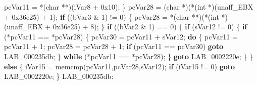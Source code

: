 \documentclass[
]{article}
\newenvironment{Shaded}{}{}
\newcommand{\BaseNTok}[1]{\textcolor[rgb]{0.25,0.63,0.44}{#1}}
\newcommand{\ControlFlowTok}[1]{\textcolor[rgb]{0.00,0.44,0.13}{\textbf{#1}}}
\newcommand{\DataTypeTok}[1]{\textcolor[rgb]{0.56,0.13,0.00}{#1}}
\newcommand{\DecValTok}[1]{\textcolor[rgb]{0.25,0.63,0.44}{#1}}
\newcommand{\NormalTok}[1]{#1}
\newcommand{\OperatorTok}[1]{\textcolor[rgb]{0.40,0.40,0.40}{#1}}
\begin{document}
\begin{Shaded}
\begin{Highlighting}[]
\NormalTok{      pcVar11 }\OperatorTok{=} \OperatorTok{*(}\DataTypeTok{char} \OperatorTok{**)(}\NormalTok{iVar8 }\OperatorTok{+} \BaseNTok{0x10}\OperatorTok{);}
    \OperatorTok{\}}
\NormalTok{    pcVar28 }\OperatorTok{=} \OperatorTok{(}\DataTypeTok{char} \OperatorTok{*)(*(}\DataTypeTok{int} \OperatorTok{*)(}\NormalTok{unaff\_EBX }\OperatorTok{+} \BaseNTok{0x36e25}\OperatorTok{)} \OperatorTok{+} \DecValTok{1}\OperatorTok{);}
    \ControlFlowTok{if} \OperatorTok{((}\NormalTok{bVar3 }\OperatorTok{\&} \DecValTok{1}\OperatorTok{)} \OperatorTok{!=} \DecValTok{0}\OperatorTok{)} \OperatorTok{\{}
\NormalTok{      pcVar28 }\OperatorTok{=} \OperatorTok{*(}\DataTypeTok{char} \OperatorTok{**)(*(}\DataTypeTok{int} \OperatorTok{*)(}\NormalTok{unaff\_EBX }\OperatorTok{+} \BaseNTok{0x36e25}\OperatorTok{)} \OperatorTok{+} \DecValTok{8}\OperatorTok{);}
    \OperatorTok{\}}
    \ControlFlowTok{if} \OperatorTok{((}\NormalTok{bVar2 }\OperatorTok{\&} \DecValTok{1}\OperatorTok{)} \OperatorTok{==} \DecValTok{0}\OperatorTok{)} \OperatorTok{\{}
      \ControlFlowTok{if} \OperatorTok{(}\NormalTok{sVar12 }\OperatorTok{!=} \DecValTok{0}\OperatorTok{)} \OperatorTok{\{}
        \ControlFlowTok{if} \OperatorTok{(*}\NormalTok{pcVar11 }\OperatorTok{==} \OperatorTok{*}\NormalTok{pcVar28}\OperatorTok{)} \OperatorTok{\{}
\NormalTok{          pcVar30 }\OperatorTok{=}\NormalTok{ pcVar11 }\OperatorTok{+}\NormalTok{ sVar12}\OperatorTok{;}
          \ControlFlowTok{do} \OperatorTok{\{}
\NormalTok{            pcVar11 }\OperatorTok{=}\NormalTok{ pcVar11 }\OperatorTok{+} \DecValTok{1}\OperatorTok{;}
\NormalTok{            pcVar28 }\OperatorTok{=}\NormalTok{ pcVar28 }\OperatorTok{+} \DecValTok{1}\OperatorTok{;}
            \ControlFlowTok{if} \OperatorTok{(}\NormalTok{pcVar11 }\OperatorTok{==}\NormalTok{ pcVar30}\OperatorTok{)} \ControlFlowTok{goto}\NormalTok{ LAB\_000235db}\OperatorTok{;}
          \OperatorTok{\}} \ControlFlowTok{while} \OperatorTok{(*}\NormalTok{pcVar11 }\OperatorTok{==} \OperatorTok{*}\NormalTok{pcVar28}\OperatorTok{);}
        \OperatorTok{\}}
        \ControlFlowTok{goto}\NormalTok{ LAB\_0002220e}\OperatorTok{;}
      \OperatorTok{\}}
    \OperatorTok{\}}
    \ControlFlowTok{else} \OperatorTok{\{}
\NormalTok{      iVar15 }\OperatorTok{=}\NormalTok{ memcmp}\OperatorTok{(}\NormalTok{pcVar11}\OperatorTok{,}\NormalTok{pcVar28}\OperatorTok{,}\NormalTok{sVar12}\OperatorTok{);}
      \ControlFlowTok{if} \OperatorTok{(}\NormalTok{iVar15 }\OperatorTok{!=} \DecValTok{0}\OperatorTok{)} \ControlFlowTok{goto}\NormalTok{ LAB\_0002220e}\OperatorTok{;}
    \OperatorTok{\}}
\NormalTok{LAB\_000235db}\OperatorTok{:}

\end{Highlighting}
\end{Shaded}
\end{document}
